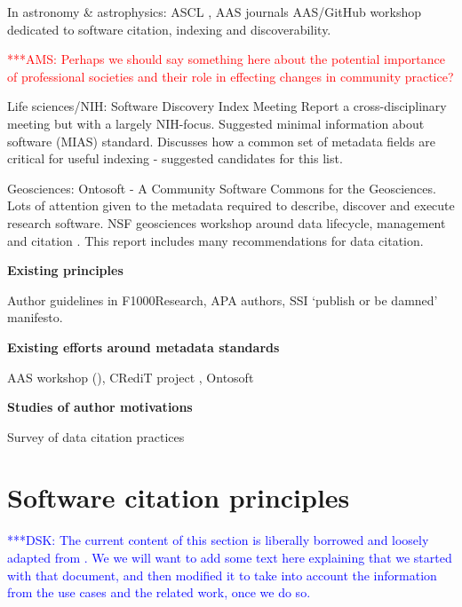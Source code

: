 \documentclass[11pt, oneside]{amsart}
\newcommand{\katznote}[1]{ {\textcolor{blue} { ***DSK: #1 }}}
\newcommand{\asnote}[1]{ {\textcolor{red} { ***AMS: #1 }}}
\begin{document}
In astronomy \& astrophysics: ASCL \cite{ascl}, AAS journals  AAS/GitHub
workshop \cite{aas-software-index} dedicated to software citation, indexing and discoverability.

\asnote{Perhaps we should say something here about the potential importance of professional societies and their role in effecting changes in community practice?}

Life sciences/NIH: Software Discovery Index Meeting Report \cite{software-discovery-index} a cross-disciplinary meeting
but with a largely NIH-focus. Suggested minimal information about software (MIAS) standard. Discusses how a common set of metadata
fields are critical for useful indexing - suggested candidates for this list.

Geosciences: Ontosoft \cite{ontosoft} - A Community Software Commons for the Geosciences. Lots of attention given to the metadata
required to describe, discover and execute research software. NSF geosciences workshop around data lifecycle, management and citation \cite{nsf-geo-data}. This report includes many recommendations for data citation.

\textbf{Existing principles}

Author guidelines in F1000Research, APA authors, SSI `publish or be damned' \cite{ssi-publish-or-be-damned} manifesto.

\textbf{Existing efforts around metadata standards}

AAS workshop (\cite{aas-software-index}), CRediT project \cite{casrai-credit}, Ontosoft \cite{ontosoft}

\textbf{Studies of author motivations}

Survey of data citation practices \cite{Kratz_2015}

\section{Software citation principles}
\label{sec:principles}

\katznote{The current content of this section is liberally borrowed and loosely adapted from \cite{data-citation-principles}.  We we will want to add some text here explaining that we started with that document, and then modified it to take into account the information from the use cases and the related work, once we do so.}
\end{document}

